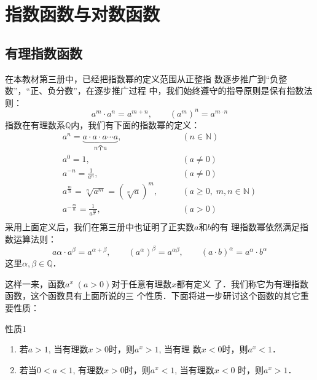 \chapter{指数函数与对数函数}
\section{有理指数函数}
在本教材第三册中，已经把指数幂的定义范围从正整指
数逐步推广到“负整数”，“正、负分数”，在逐步推广过程
中，我们始终遵守的指导原则是保有指数法则：
\[a^m\cdot a^n=a^{m+n},\qquad  (a^m)^n=a^{m\cdot n}\]
指数在有理数系$\mathbb{Q}$内，我们有下面的指数幂的定义：
\[\begin{split}
  a^n=\underbrace{a\cdot a\cdot a\cdots a}_{\text{$n$个$a$}},&\qquad (n\in\mathbb{N})\\  
a^0=1,&\qquad (a\ne 0)\\  
a^{-n}=\frac{1}{a^n},&\qquad (a\ne 0)\\ 
a^{\tfrac{m}{n}}=\sqrt[n]{a^m}=\left(\sqrt[n]{a}\right)^m,&\qquad (a\ge 0,\; m,n\in\mathbb{N})\\ 
a^{-\tfrac{m}{n}}=\frac{1}{a^{\tfrac{m}{n}}},&\qquad (a> 0)\\ 
\end{split}\]
采用上面定义后，我们在第三册中也证明了正实数$a$和$b$的有
理指数幂依然满足指数运算法则：
\[a{\alpha}\cdot a^{\beta}=a^{\alpha+\beta},\qquad (a^{\alpha})^{\beta}=a^{\alpha\beta},\qquad (a\cdot b)^{\alpha}=a^{\alpha}\cdot b^{\alpha}\]
这里$\alpha,\beta \in \mathbb{Q}$．

这样一来，函数$a^x\; (a>0)$对于任意有理数$x$都有定义
了．我们称它为有理指数函数，这个函数具有上面所说的三
个性质．下面将进一步研讨这个函数的其它重要性质：

\begin{blk}{性质1}
\begin{enumerate}
    \item 若$a>1$, 当有理数$x>0$时，则$a^x>1$, 当有理
    数$x<0$时，则$a^x<1$．
    \item 若当$0<a<1$, 有理数$x>0$时，则$a^x<1$, 当有理数$x<0$
    时，则$a^x>1$．
\end{enumerate}
\end{blk}

